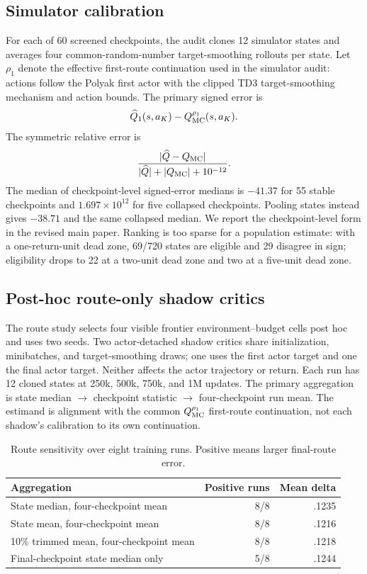 \documentclass[letterpaper]{article}
\begin{document}
\subsection{Simulator calibration}
For each of 60 screened checkpoints, the audit clones 12 simulator states and averages four common-random-number target-smoothing rollouts per state. Let $\rho_1$ denote the effective first-route continuation used in the simulator audit: actions follow the Polyak first actor with the clipped TD3 target-smoothing mechanism and action bounds. The primary signed error is
\begin{equation}
\widehat Q_1(s,a_K)-Q_{\rm MC}^{\rho_1}(s,a_K).
\end{equation}
The symmetric relative error is
\begin{equation}
\frac{|\widehat Q-Q_{\rm MC}|}{|\widehat Q|+|Q_{\rm MC}|+10^{-12}}.
\end{equation}
The median of checkpoint-level signed-error medians is $-41.37$ for 55 stable checkpoints and $1.697\times10^{12}$ for five collapsed checkpoints. Pooling states instead gives $-38.71$ and the same collapsed median. We report the checkpoint-level form in the revised main paper. Ranking is too sparse for a population estimate: with a one-return-unit dead zone, 69/720 states are eligible and 29 disagree in sign; eligibility drops to 22 at a two-unit dead zone and two at a five-unit dead zone.

\subsection{Post-hoc route-only shadow critics}
The route study selects four visible frontier environment--budget cells post hoc and uses two seeds. Two actor-detached shadow critics share initialization, minibatches, and target-smoothing draws; one uses the first actor target and one the final actor target. Neither affects the actor trajectory or return. Each run has 12 cloned states at 250k, 500k, 750k, and 1M updates. The primary aggregation is state median $\to$ checkpoint statistic $\to$ four-checkpoint run mean. The estimand is alignment with the common $Q_{\rm MC}^{\rho_1}$ first-route continuation, not each shadow's calibration to its own continuation.

\begin{table}[h]
\caption{Route sensitivity over eight training runs. Positive means larger final-route error.}
\centering
\small
\begin{tabular}{lrr}
\toprule
Aggregation&Positive runs&Mean delta\\
\midrule
State median, four-checkpoint mean&8/8&.1235\\
State mean, four-checkpoint mean&8/8&.1216\\
10\% trimmed mean, four-checkpoint mean&8/8&.1218\\
Final-checkpoint state median only&5/8&.1244\\
\bottomrule
\end{tabular}
\label{tab:route_sensitivity}
\end{table}
\end{document}

